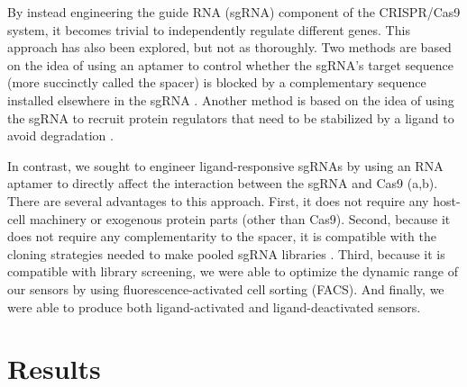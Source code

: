 \documentclass[10pt,oneside]{article}
\begin{document}

By instead engineering the guide RNA (sgRNA) component of the CRISPR/Cas9 system, it becomes trivial to independently regulate different genes.  This approach has also been explored, but not as thoroughly.  Two methods are based on the idea of using an aptamer to control whether the sgRNA's  target sequence (more succinctly called the spacer) is blocked by a complementary sequence installed elsewhere in the sgRNA \autocite{liu2016,tang2017}.  Another method is based on the idea of using the sgRNA to recruit protein regulators that need to be stabilized by a ligand to avoid degradation \autocite{maji2017}.%


In contrast, we sought to engineer ligand-responsive sgRNAs by using an RNA aptamer to directly affect the interaction between the sgRNA and Cas9 (a,b).  There are several advantages to this approach.  First, it does not require any host-cell machinery or exogenous protein parts (other than Cas9).  Second, because it does not require any complementarity to the spacer, it is compatible with the cloning strategies needed to make pooled sgRNA libraries \autocite{gilbert2014}.  Third, because it is compatible with library screening, we were able to optimize the dynamic range of our sensors by using fluorescence-activated cell sorting (FACS).  And finally, we were able to produce both ligand-activated and ligand-deactivated sensors.


\section{Results}

\end{document}
